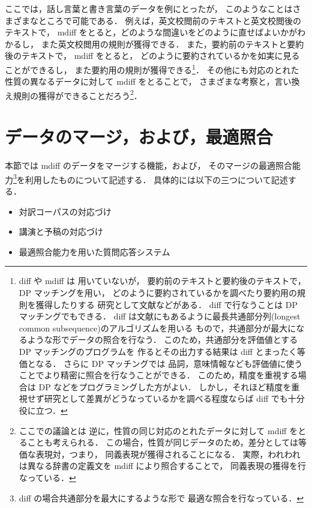 ここでは，話し言葉と書き言葉のデータを例にとったが，
このようなことはさまざまなところで可能である．
例えば，英文校閲前のテキストと英文校閲後のテキストで，
mdiff をとると，どのような間違いをどのように直せばよいかがわかるし，
また英文校閲用の規則が獲得できる．
また，要約前のテキストと要約後のテキストで，
mdiff をとると，
どのように要約されているかを如実に見ることができるし，
また要約用の規則が獲得できる\footnote{diff や mdiff は
用いていないが，
要約前のテキストと要約後のテキストで，DP マッチングを用い，
どのように要約されているかを調べたり要約用の規則を獲得したりする
研究として文献\cite{Kato1999,mochinushi2000}などがある．
diff で行なうことは DP マッチングでもできる．
diff は文献にもあるように最長共通部分列(longest common subsequence)のアルゴリズムを用いる
もので，共通部分が最大になるような形でデータの照合を行なう．
このため，共通部分を評価値とする DP マッチングのプログラムを
作るとその出力する結果は diff とまったく等価となる．
さらに DP マッチングでは
品詞，意味情報なども評価値に使うことでより精密に照合を行なうことができる．
このため，精度を重視する場合は DP などをプログラミングした方がよい．
しかし，それほど精度を重視せず研究として差異がどうなっているかを調べる程度ならば
diff でも十分役に立つ．}．
その他にも対応のとれた性質の異なるデータに対して mdiff をとることで，
さまざまな考察と，言い換え規則の獲得ができることだろう\footnote{ここでの議論とは
逆に，性質の同じ対応のとれたデータに対して mdiff をとることも考えられる．
この場合，性質が同じデータのため，差分としては等価な表現対，つまり，
同義表現が獲得されることになる．
実際，われわれは異なる辞書の定義文を mdiff により照合することで，
同義表現の獲得\cite{murata_nl2001_henkei}を行なっている．}．

\section{データのマージ，および，最適照合}
\label{sec:merge}

本節では mdiff のデータをマージする機能，および，
そのマージの最適照合能力\footnote{diff の場合共通部分を最大にするような形で
最適な照合を行なっている．}を利用したものについて記述する．
具体的には以下の三つについて記述する．

\begin{itemize}
\item 
  対訳コーパスの対応づけ
\item 
  講演と予稿の対応づけ
\item 
  最適照合能力を用いた質問応答システム
\end{itemize}

